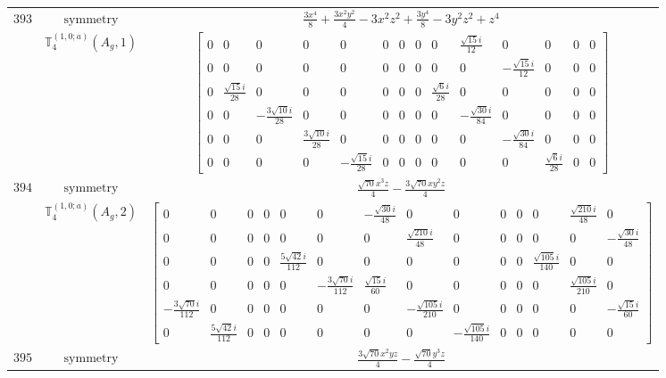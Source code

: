 \documentclass[fleqn,8pt,landscape]{jsarticle}
\begin{document}
\begin{longtable}{ccc}
$ 393 $ & $ \text{symmetry} $ & $ \frac{3 x^{4}}{8} + \frac{3 x^{2} y^{2}}{4} - 3 x^{2} z^{2} + \frac{3 y^{4}}{8} - 3 y^{2} z^{2} + z^{4} $ \\
$  $ & $ \mathbb{T}_{4}^{(1,0;a)}(A_{g},1) $ & $ \begin{bmatrix} 0 & 0 & 0 & 0 & 0 & 0 & 0 & 0 & 0 & \frac{\sqrt{15} i}{12} & 0 & 0 & 0 & 0 \\ 0 & 0 & 0 & 0 & 0 & 0 & 0 & 0 & 0 & 0 & - \frac{\sqrt{15} i}{12} & 0 & 0 & 0 \\ 0 & \frac{\sqrt{15} i}{28} & 0 & 0 & 0 & 0 & 0 & 0 & \frac{\sqrt{6} i}{28} & 0 & 0 & 0 & 0 & 0 \\ 0 & 0 & - \frac{3 \sqrt{10} i}{28} & 0 & 0 & 0 & 0 & 0 & 0 & - \frac{\sqrt{30} i}{84} & 0 & 0 & 0 & 0 \\ 0 & 0 & 0 & \frac{3 \sqrt{10} i}{28} & 0 & 0 & 0 & 0 & 0 & 0 & - \frac{\sqrt{30} i}{84} & 0 & 0 & 0 \\ 0 & 0 & 0 & 0 & - \frac{\sqrt{15} i}{28} & 0 & 0 & 0 & 0 & 0 & 0 & \frac{\sqrt{6} i}{28} & 0 & 0 \end{bmatrix} $ \\ \hline
$ 394 $ & $ \text{symmetry} $ & $ \frac{\sqrt{70} x^{3} z}{4} - \frac{3 \sqrt{70} x y^{2} z}{4} $ \\
$  $ & $ \mathbb{T}_{4}^{(1,0;a)}(A_{g},2) $ & $ \begin{bmatrix} 0 & 0 & 0 & 0 & 0 & 0 & - \frac{\sqrt{30} i}{48} & 0 & 0 & 0 & 0 & 0 & \frac{\sqrt{210} i}{48} & 0 \\ 0 & 0 & 0 & 0 & 0 & 0 & 0 & \frac{\sqrt{210} i}{48} & 0 & 0 & 0 & 0 & 0 & - \frac{\sqrt{30} i}{48} \\ 0 & 0 & 0 & 0 & \frac{5 \sqrt{42} i}{112} & 0 & 0 & 0 & 0 & 0 & 0 & \frac{\sqrt{105} i}{140} & 0 & 0 \\ 0 & 0 & 0 & 0 & 0 & - \frac{3 \sqrt{70} i}{112} & \frac{\sqrt{15} i}{60} & 0 & 0 & 0 & 0 & 0 & \frac{\sqrt{105} i}{210} & 0 \\ - \frac{3 \sqrt{70} i}{112} & 0 & 0 & 0 & 0 & 0 & 0 & - \frac{\sqrt{105} i}{210} & 0 & 0 & 0 & 0 & 0 & - \frac{\sqrt{15} i}{60} \\ 0 & \frac{5 \sqrt{42} i}{112} & 0 & 0 & 0 & 0 & 0 & 0 & - \frac{\sqrt{105} i}{140} & 0 & 0 & 0 & 0 & 0 \end{bmatrix} $ \\ \hline
$ 395 $ & $ \text{symmetry} $ & $ \frac{3 \sqrt{70} x^{2} y z}{4} - \frac{\sqrt{70} y^{3} z}{4} $ \\

\end{longtable}
\end{document}
